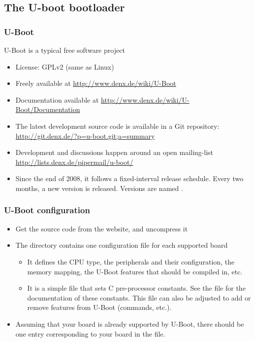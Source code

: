 \subsection{The U-boot bootloader}

\begin{frame}
  \frametitle{U-Boot}
  U-Boot is a typical free software project
  \begin{itemize}
  \item License: GPLv2 (same as Linux)
  \item Freely available at \url{http://www.denx.de/wiki/U-Boot}
  \item Documentation available at
    \url{http://www.denx.de/wiki/U-Boot/Documentation}
  \item The latest development source code is available in a Git
    repository:
    \url{http://git.denx.de/?p=u-boot.git;a=summary}
  \item Development and discussions happen around an open mailing-list
    \url{http://lists.denx.de/pipermail/u-boot/}
  \item Since the end of 2008, it follows a fixed-interval release
    schedule. Every two months, a new version is released. Versions
    are named .
\end{itemize}
\end{frame}

\begin{frame}
  \frametitle{U-Boot configuration}
  \begin{itemize}
  \item Get the source code from the website, and uncompress it
  \item The  directory contains one
    configuration file for each supported board
    \begin{itemize}
    \item It defines the CPU type, the peripherals and their configuration, the
      memory mapping, the U-Boot features that should be compiled in, etc.
    \item It is a simple  file that sets C pre-processor
      constants. See the  file for the documentation of
      these constants. This file can also be adjusted to add or remove
      features from U-Boot (commands, etc.).
    \end{itemize}
  \item Assuming that your board is already supported by U-Boot, there
    should be one entry corresponding to your board in the
     file.
  \end{itemize}
\end{frame}

